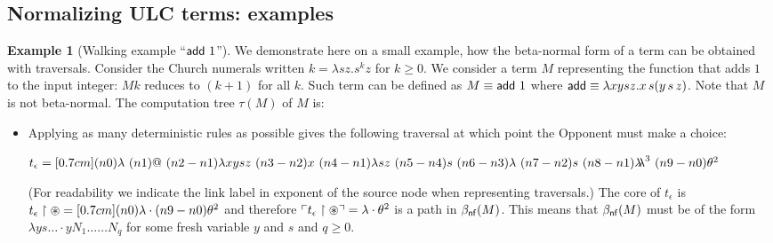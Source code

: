 \documentclass{article}
\theoremstyle{definition}
\newtheorem{example}{Example}[section]
\newcommand{\ghostlmd}{{\lambda\!\!\lambda}}
\newcommand{\ghostvar}{\theta}
\begin{document}
\subsection{Normalizing ULC terms: examples}

\begin{example}[Walking example ``${\sf add}\ 1$'']
We demonstrate here on a small example, how the beta-normal form of a term can be obtained with traversals.
Consider the Church numerals written $k = \lambda s z . s^k z$ for $k\geq0$. We consider a term $M$ representing the function that adds $1$ to the input integer: $M k$ reduces to $(k+1)$ for all $k$. Such term can be defined as $M \equiv{\sf add}\ 1$ where
${\sf add} \equiv \lambda x y s z. x\, s (y\, s\, z)$.
Note that $M$ is not beta-normal.
The computation tree $\tau(M)$ of $M$ is:

\begin{itemize}
\item Applying as many deterministic rules as possible gives the following traversal at which point the Opponent must make a choice:

$t_\epsilon = \Pstr[0.7cm]{(n0){\lambda }\ (n1){@}\ (n2-n1){\lambda x y s z}\ (n3-n2){x}\ (n4-n1){\lambda s z}\ (n5-n4){s}\ (n6-n3){\lambda }\ (n7-n2){s}\ (n8-n1){\ghostlmd^3}\ (n9-n0){\ghostvar^2} }$

(For readability we indicate the link label in exponent of the source node when representing traversals.)
The core of $t_\epsilon$ is
$t_\epsilon\filter\theroot = \Pstr[0.7cm]{(n0){\lambda } \cdot (n9-n0){{\ghostvar^2}} }$
and therefore $\pview{t_\epsilon\filter\theroot} =  \lambda \cdot \ghostvar^2$ is a path in  $\beta_{\sf nf}(M)$.
This means that $\beta_{\sf nf}(M)$ must be of the form $\lambda y s \ldots \cdot y N_1 \ldots \ldots N_q$ for some fresh variable $y$ and $s$ and $q\geq0$.


\end{itemize}
\end{example}
\end{document}

